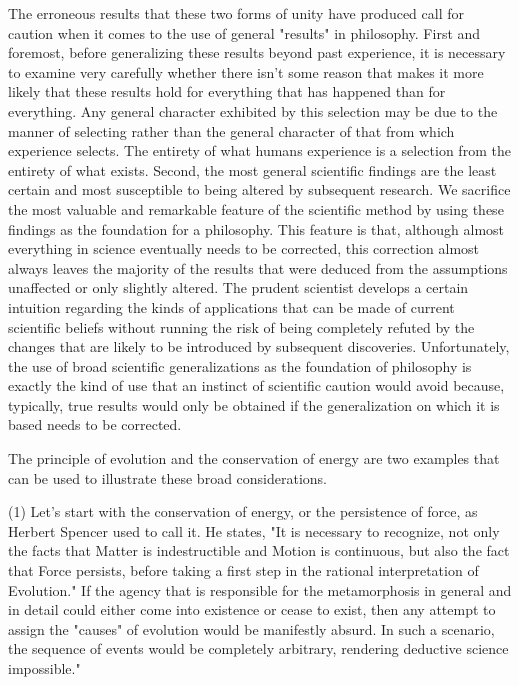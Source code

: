 \documentclass[a4paper,12pt]{book}[2004/02/16]
\theoremstyle{ilemma}
\theoremstyle{itheorem}
\theoremstyle{iother}
\theoremstyle{icorollary}
\theoremstyle{numcorollary}
\theoremstyle{idefinition}
\begin{document}
The erroneous results that these two forms of unity have produced call for caution when it comes to the use of general "results" in philosophy. First and foremost, before generalizing these results beyond past experience, it is necessary to examine very carefully whether there isn't some reason that makes it more likely that these results hold for everything that has happened than for everything. Any general character exhibited by this selection may be due to the manner of selecting rather than the general character of that from which experience selects. The entirety of what humans experience is a selection from the entirety of what exists. Second, the most general scientific findings are the least certain and most susceptible to being altered by subsequent research. We sacrifice the most valuable and remarkable feature of the scientific method by using these findings as the foundation for a philosophy. This feature is that, although almost everything in science eventually needs to be corrected, this correction almost always leaves the majority of the results that were deduced from the assumptions unaffected or only slightly altered. The prudent scientist develops a certain intuition regarding the kinds of applications that can be made of current scientific beliefs without running the risk of being completely refuted by the changes that are likely to be introduced by subsequent discoveries. Unfortunately, the use of broad scientific generalizations as the foundation of philosophy is exactly the kind of use that an instinct of scientific caution would avoid because, typically, true results would only be obtained if the generalization on which it is based needs to be corrected.

The principle of evolution and the conservation of energy are two examples that can be used to illustrate these broad considerations.

(1) Let's start with the conservation of energy, or the persistence of force, as Herbert Spencer used to call it. He states, "It is necessary to recognize, not only the facts that Matter is indestructible and Motion is continuous, but also the fact that Force persists, before taking a first step in the rational interpretation of Evolution." If the agency that is responsible for the metamorphosis in general and in detail could either come into existence or cease to exist, then any attempt to assign the "causes" of evolution would be manifestly absurd. In such a scenario, the sequence of events would be completely arbitrary, rendering deductive science impossible."
\end{document}

